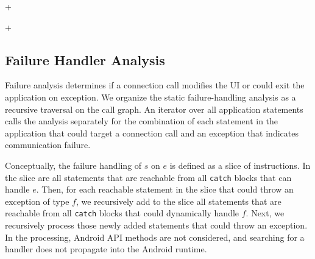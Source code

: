 \lstDeleteShortInline+

\lstMakeShortInline[basicstyle=\scriptsize\ttfamily,keywordstyle=\color{DarkPurple},breaklines=false]+



\subsection{Failure Handler Analysis}
\label{sec:failure-handling}

Failure analysis determines if a connection call modifies the UI or
could exit the application on exception.  We organize the static
failure-handling analysis as a recursive traversal on the call graph.
An iterator over all application statements calls the analysis
separately for the combination of each statement in the application
that could target a connection call and an exception that indicates
communication failure.

Conceptually, the failure handling of $s$ on $e$ is defined as a slice
of instructions.  In the slice are all statements that are reachable
from all \lstinline!catch! blocks that can handle $e$.  Then, for each
reachable statement in the slice that could throw an exception of type
$f$, we recursively add to the slice all statements that are reachable
from all \lstinline!catch!  blocks that could dynamically handle $f$.
Next, we recursively process those newly added statements that could
throw an exception.  In the processing, Android API methods are not
considered, and searching for a handler does not propagate into the
Android runtime.

